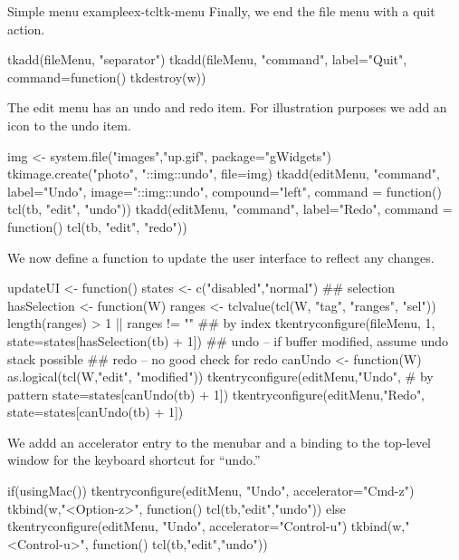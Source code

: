 \begin{example}{Simple menu example}{ex-tcltk-menu}
Finally, we end the file menu with a quit action. 
\begin{Schunk}
\begin{Sinput}
 tkadd(fileMenu, "separator")
 tkadd(fileMenu, "command", label="Quit", 
       command=function() tkdestroy(w))
\end{Sinput}
\end{Schunk}

The edit menu has an undo and redo item. For illustration purposes we add an icon to the undo item.
\begin{Schunk}
\begin{Sinput}
 img <- system.file("images","up.gif", package="gWidgets")
 tkimage.create("photo", "::img::undo", file=img)
 tkadd(editMenu, "command", label="Undo",
       image="::img::undo", compound="left",
       command = function() tcl(tb, "edit", "undo"))
 tkadd(editMenu, "command", label="Redo",
       command = function() tcl(tb, "edit", "redo"))
\end{Sinput}
\end{Schunk}

We now define a function to update the user interface to reflect any changes.
\begin{Schunk}
\begin{Sinput}
 updateUI <- function() {
   states <- c("disabled","normal")
   ## selection
   hasSelection <- function(W) {
     ranges <- tclvalue(tcl(W, "tag", "ranges", "sel"))
     length(ranges) > 1 || ranges != ""
   }
   ## by index  
   tkentryconfigure(fileMenu, 1,  
                    state=states[hasSelection(tb) + 1]) 
   ## undo -- if buffer modified, assume undo stack possible
   ## redo -- no good check for redo
   canUndo <- function(W) as.logical(tcl(W,"edit", "modified"))
   tkentryconfigure(editMenu,"Undo",     # by pattern
                    state=states[canUndo(tb) + 1])
   tkentryconfigure(editMenu,"Redo", 
                    state=states[canUndo(tb) + 1])
 }
\end{Sinput}
\end{Schunk}

We addd an accelerator entry to the menubar and a binding to the
top-level window for the keyboard shortcut for ``undo.''
\begin{Schunk}
\begin{Sinput}
 if(usingMac()) {
   tkentryconfigure(editMenu, "Undo", accelerator="Cmd-z")
   tkbind(w,"<Option-z>", function() tcl(tb,"edit","undo"))
 } else {
   tkentryconfigure(editMenu, "Undo", accelerator="Control-u")
   tkbind(w,"<Control-u>", function() tcl(tb,"edit","undo"))
 }
\end{Sinput}
\end{Schunk}
%


\end{example}
